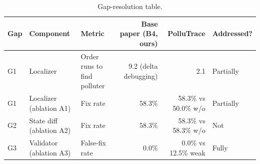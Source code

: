 \begin{table}[t]
\centering
\footnotesize
\caption{Gap-resolution table.}
\label{tab:gap}
\begin{tabular}{lllrrl}
\toprule
\textbf{Gap} & \textbf{Component} & \textbf{Metric} & \textbf{Base paper (B4, ours)} & \textbf{PolluTrace} & \textbf{Addressed?} \\
\midrule
G1 & Localizer & Order runs to find polluter & 9.2 (delta debugging) & 2.1 & Partially \\
G1 & Localizer (ablation A1) & Fix rate & 58.3\% & 58.3\% vs 50.0\% w/o & Partially \\
G2 & State diff (ablation A2) & Fix rate & 58.3\% & 58.3\% vs 58.3\% w/o & Not \\
G3 & Validator (ablation A3) & False-fix rate & 0.0\% & 0.0\% vs 12.5\% weak & Fully \\
\bottomrule
\end{tabular}
\end{table}
